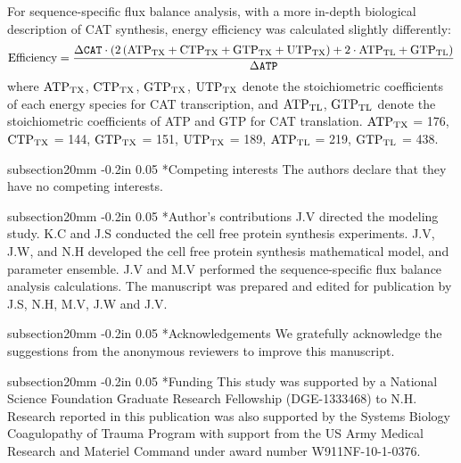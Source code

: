 \documentclass[12pt]{article}
\makeatletter
\renewcommand\section{\@startsection
	{subsection}{2}{0mm}
	{-0.2in}
	{0.05\baselineskip}
	{\normalfont\large\bfseries}}
\makeatother
\begin{document}
For sequence-specific flux balance analysis, with a more in-depth biological description of CAT synthesis, energy efficiency was calculated slightly differently:
\begin{equation}\label{eqn:energy-efficiency-definition}
	\rm Efficiency=\frac{\Delta\texttt{CAT}\cdot \left(2\left({ATP}_{TX}+\rm {CTP}_{TX}+\rm {GTP}_{TX}+\rm {UTP}_{TX}\right)+\rm2\cdot\rm {ATP}_{TL}+\rm {GTP}_{TL}\right)}{\Delta\texttt{ATP}}
\end{equation}
where $\rm {ATP}_{TX}$, $\rm {CTP}_{TX}$, $\rm {GTP}_{TX}$, $\rm {UTP}_{TX}$ denote the stoichiometric coefficients of each energy species for CAT transcription, and $\rm {ATP}_{TL}$, $\rm {GTP}_{TL}$ denote the stoichiometric coefficients of ATP and GTP for CAT translation.
$\rm {ATP}_{TX}$ = 176, $\rm {CTP}_{TX}$ = 144, $\rm {GTP}_{TX}$ = 151, $\rm {UTP}_{TX}$ = 189, $\rm {ATP}_{TL}$ = 219, $\rm {GTP}_{TL}$ = 438.

\clearpage

\section*{Competing interests}
The authors declare that they have no competing interests.

\section*{Author's contributions}
J.V directed the modeling study.
K.C and J.S conducted the cell free protein synthesis experiments.
J.V, J.W, and N.H developed the cell free protein synthesis mathematical model, and parameter ensemble.
J.V and M.V performed the sequence-specific flux balance analysis calculations.
The manuscript was prepared and edited for publication by J.S, N.H, M.V, J.W and J.V.

\section*{Acknowledgements}
We gratefully acknowledge the suggestions from the anonymous reviewers to improve this manuscript.

\section*{Funding}
This study was supported by a National Science Foundation Graduate Research Fellowship (DGE-1333468) to N.H.
Research reported in this publication was also supported by the Systems Biology Coagulopathy of Trauma Program
with support from the US Army Medical Research and Materiel Command under award number W911NF-10-1-0376.
\end{document}
